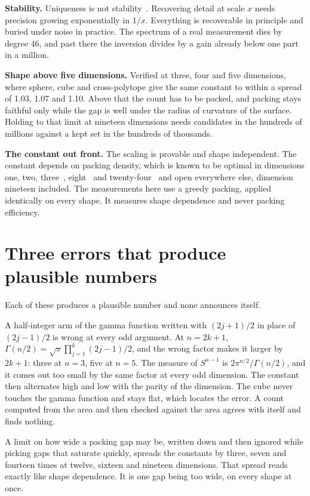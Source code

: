 \textbf{Stability.} Uniqueness is not stability~\cite{src:Mandache-2001}. Recovering detail at scale $x$ needs precision growing exponentially in $1/x$. Everything is recoverable in principle and buried under noise in practice. The spectrum of a real measurement dies by degree 46, and past there the inversion divides by a gain already below one part in a million.

\textbf{Shape above five dimensions.} Verified at three, four and five dimensions, where sphere, cube and cross-polytope give the same constant to within a spread of 1.03, 1.07 and 1.10. Above that the count has to be packed, and packing stays faithful only while the gap is well under the radius of curvature of the surface. Holding to that limit at nineteen dimensions needs candidates in the hundreds of millions against a kept set in the hundreds of thousands.

\textbf{The constant out front.} The scaling is provable and shape independent. The constant depends on packing density, which is known to be optimal in dimensions one, two, three~\cite{src:Hales-2005}, eight~\cite{src:Viazovska-2017} and twenty-four~\cite{src:Cohn-Kumar-Miller-Radchenko-and-Viazovska-2017} and open everywhere else, dimension nineteen included. The measurements here use a greedy packing, applied identically on every shape. It measures shape dependence and never packing efficiency.

\section{Three errors that produce plausible numbers}

Each of these produces a plausible number and none announces itself.

A half-integer arm of the gamma function written with $(2j+1)/2$ in place of $(2j-1)/2$ is wrong at every odd argument. At $n = 2k+1$, $\Gamma(n/2) = \sqrt{\pi}\prod_{j=1}^{k}(2j-1)/2$, and the wrong factor makes it larger by $2k+1$: three at $n = 3$, five at $n = 5$. The measure of $S^{n-1}$ is $2\pi^{n/2}/\Gamma(n/2)$, and it comes out too small by the same factor at every odd dimension. The constant then alternates high and low with the parity of the dimension. The cube never touches the gamma function and stays flat, which locates the error. A count computed from the area and then checked against the area agrees with itself and finds nothing.

A limit on how wide a packing gap may be, written down and then ignored while picking gaps that saturate quickly, spreads the constants by three, seven and fourteen times at twelve, sixteen and nineteen dimensions. That spread reads exactly like shape dependence. It is one gap being too wide, on every shape at once.

